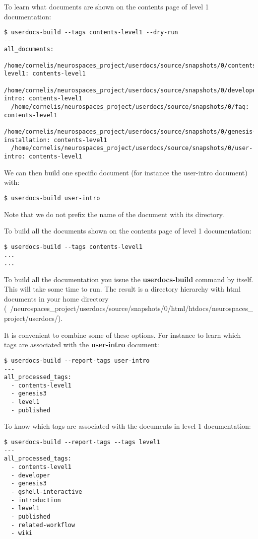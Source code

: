 \documentclass[12pt]{article}
\begin{document}
To learn what documents are shown on the contents page of level 1
documentation:

\begin{verbatim}
$ userdocs-build --tags contents-level1 --dry-run
---
all_documents:
  /home/cornelis/neurospaces_project/userdocs/source/snapshots/0/contents-level1: contents-level1
  /home/cornelis/neurospaces_project/userdocs/source/snapshots/0/developer-intro: contents-level1
  /home/cornelis/neurospaces_project/userdocs/source/snapshots/0/faq: contents-level1
  /home/cornelis/neurospaces_project/userdocs/source/snapshots/0/genesis-installation: contents-level1
  /home/cornelis/neurospaces_project/userdocs/source/snapshots/0/user-intro: contents-level1
\end{verbatim}

We can then build one specific document (for instance the user-intro
document) with:

\begin{verbatim}
$ userdocs-build user-intro
\end{verbatim}

Note that we do not prefix the name of the document with its
directory.

To build all the documents shown on the contents page of level 1
documentation:

\begin{verbatim}
$ userdocs-build --tags contents-level1
...
...
\end{verbatim}

To build all the documentation you issue the {\bf userdocs-build}
command by itself.  This will take some time to run.  The result is a
directory hierarchy with html documents in your home directory
(~/neurospaces\_project/userdocs/source/snapshots/0/html/htdocs/neurospaces\_project/userdocs/).

It is convenient to combine some of these options.  For instance to
learn which tags are associated with the {\bf user-intro} document:

\begin{verbatim}
$ userdocs-build --report-tags user-intro
---
all_processed_tags:
  - contents-level1
  - genesis3
  - level1
  - published
\end{verbatim}

To know which tags are associated with the documents in level 1
documentation:

\begin{verbatim}
$ userdocs-build --report-tags --tags level1
---
all_processed_tags:
  - contents-level1
  - developer
  - genesis3
  - gshell-interactive
  - introduction
  - level1
  - published
  - related-workflow
  - wiki
\end{verbatim}
\end{document}

